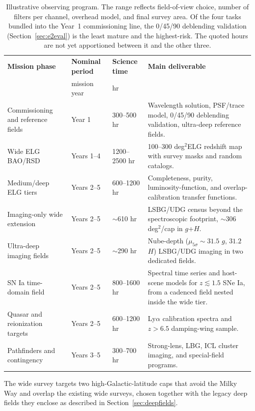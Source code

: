 \documentclass[10pt,onecolumn]{article}
\newcommand{\degti}{deg$^2$}
\begin{document}
\begin{table}[tp]
\centering
\sffamily\small
\begin{tabularx}{\textwidth}{@{}p{3.0cm}p{3.0cm}p{3.2cm}Y@{}}
\toprule
\textbf{Mission phase} & \textbf{Nominal period} & \textbf{Science time} & \textbf{Main deliverable}\\
 & mission year & hr & \\
\midrule
Commissioning and reference fields & Year 1 & 300--500 hr & Wavelength solution, PSF/trace model, 0/45/90 deblending validation, ultra-deep reference fields.\\
Wide ELG BAO/RSD & Years 1--4 & 1200--2500 hr & 100--300 \degti ELG redshift map with survey masks and random catalogs.\\
Medium/deep ELG tiers & Years 2--5 & 600--1200 hr & Completeness, purity, luminosity-function, and overlap-calibration transfer functions.\\
Imaging-only wide extension & Years 2--5 & $\sim$610 hr & LSBG/UDG census beyond the spectroscopic footprint, $\sim$306 \degti/cap in $g$+$H$.\\
Ultra-deep imaging fields & Years 2--5 & $\sim$290 hr & Nube-depth ($\mu_{5\sigma}\sim31.5$ $g$, $31.2$ $H$) LSBG/UDG imaging in two dedicated fields.\\
SN Ia time-domain field & Years 2--5 & 800--1600 hr & Spectral time series and host-scene models for $z\lesssim1.5$ SNe Ia, from a cadenced field nested inside the wide tier.\\
Quasar and reionization targets & Years 2--5 & 600--1200 hr & Ly$\alpha$ calibration spectra and $z>6.5$ damping-wing sample.\\
Pathfinders and contingency & Years 3--5 & 300--700 hr & Strong-lens, LBG, ICL cluster imaging, and special-field programs.\\
\bottomrule
\end{tabularx}
\caption{Illustrative observing program. The range reflects field-of-view choice, number of filters per channel, overhead model, and final survey area. Of the four tasks bundled into the Year~1 commissioning line, the 0/45/90 deblending validation (Section~\ref{sec:e2eval}) is the least mature and the highest-risk. The quoted hours are not yet apportioned between it and the other three.}
\label{tab:timeline}
\end{table}



The wide survey targets two high-Galactic-latitude caps that avoid the Milky Way and overlap the existing wide surveys, chosen together with the legacy deep fields they enclose as described in Section~\ref{sec:deepfields}.
\end{document}
